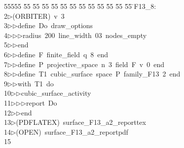 %
%
\begin{tabbing}
55555 \= 55 \= 55 \= 55 \= 55 \= 55 \= 55 \= 55 \= 55 \= 55 \= 55 \= 55 \= 55 \= \>F13\_8:\\[0pt]
2\>$\triangleright$\>(ORBITER)\ v\ 3\ \\[0pt]
3\>$\triangleright$\>$\triangleright$\>define\ Do\ draw\_options\ \\[0pt]
4\>$\triangleright$\>$\triangleright$\>$\triangleright$\>radius\ 200\ line\_width\ 03\ nodes\_empty\ \\[0pt]
5\>$\triangleright$\>$\triangleright$\>end\ \\[0pt]
6\>$\triangleright$\>$\triangleright$\>define\ F\ finite\_field\ q\ 8\ end\ \\[0pt]
7\>$\triangleright$\>$\triangleright$\>define\ P\ projective\_space\ n\ 3\ field\ F\ v\ 0\ end\ \\[0pt]
8\>$\triangleright$\>$\triangleright$\>define\ T1\ cubic\_surface\ space\ P\ family\_F13\ 2\ end\ \\[0pt]
9\>$\triangleright$\>$\triangleright$\>with\ T1\ do\ \\[0pt]
10\>$\triangleright$\>$\triangleright$\>cubic\_surface\_activity\ \\[0pt]
11\>$\triangleright$\>$\triangleright$\>$\triangleright$\>report\ Do\ \\[0pt]
12\>$\triangleright$\>$\triangleright$\>end\\[0pt]
13\>$\triangleright$\>(PDFLATEX)\ surface\_F13\_a2\_reporttex\\[0pt]
14\>$\triangleright$\>(OPEN)\ surface\_F13\_a2\_reportpdf\\[0pt]
15\>\end{tabbing}
